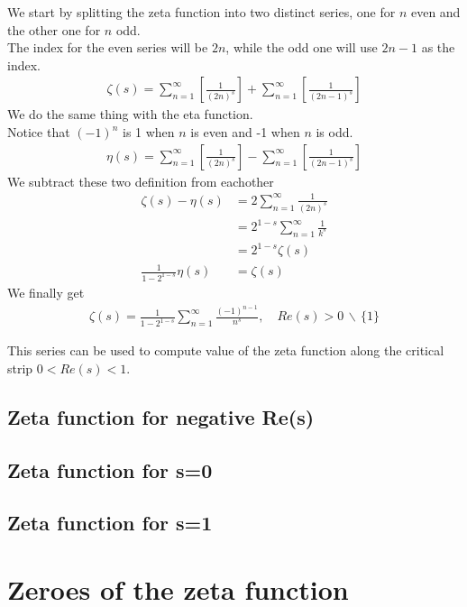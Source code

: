 \documentclass{article}
\newcommand{\exceptone}{
    \,\backslash\,\{1\}
}
\begin{document}
We start by splitting the zeta function into two distinct series, one for $n$ even and the other one for $n$ odd.
\\
The index for the even series will be $2n$, while the odd one will use $2n-1$ as the index.
\begin{align*}
    \zeta(s)=
    \sum_{n=1}^{\infty}\left[\frac{1}{(2n)^s}\right]+
    \sum_{n=1}^{\infty}\left[\frac{1}{(2n-1)^s}\right]
\end{align*}
We do the same thing with the eta function.
\\
Notice that $(-1)^n$ is 1 when $n$ is even and -1 when $n$ is odd.
\begin{align*}
    \eta(s)=
    \sum_{n=1}^{\infty}\left[\frac{1}{(2n)^s}\right]-
    \sum_{n=1}^{\infty}\left[\frac{1}{(2n-1)^s}\right]
\end{align*}
We subtract these two definition from eachother
\begin{align*}
    \zeta(s)-\eta(s)&=
    2\sum_{n=1}^{\infty}\frac{1}{(2n)^s}
    \\
    &=2^{1-s}\sum_{n=1}^{\infty}\frac{1}{k^s}
    \\
    &=2^{1-s}\zeta(s)
    \\
    \frac{1}{1-2^{1-s}}\eta(s)&=\zeta(s)
\end{align*}
We finally get
\begin{align*}
    \zeta(s)=\frac{1}{1-2^{1-s}}\sum_{n=1}^{\infty}\frac{(-1)^{n-1}}{n^s},
    \quad Re(s)>0\exceptone
\end{align*}

This series can be used to compute value of the zeta function along the critical strip $0<Re(s)<1$.

\subsection{Zeta function for negative Re(s)}

\subsection{Zeta function for s=0}

\subsection{Zeta function for s=1}

\pagebreak

\section{Zeroes of the zeta function}
\end{document}
